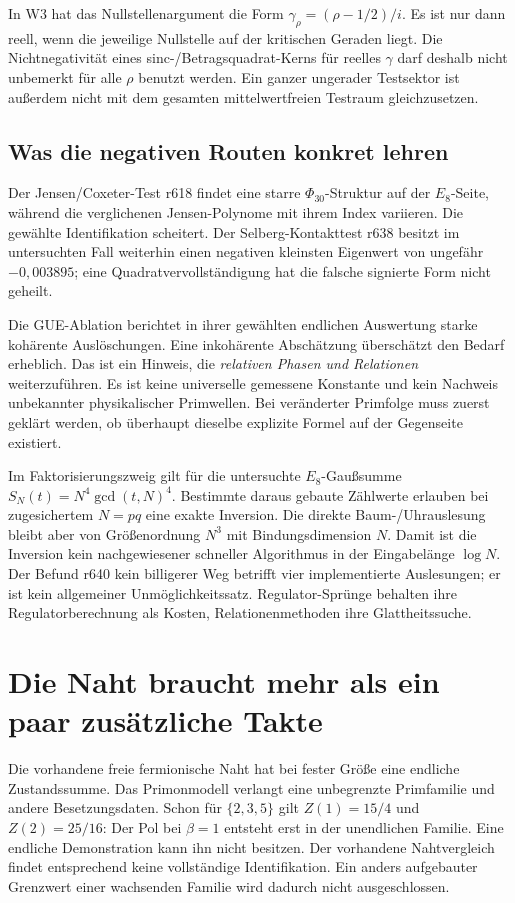 In W3 hat das Nullstellenargument die Form $\gamma_\rho=(\rho-1/2)/i$. Es ist nur dann reell, wenn die jeweilige Nullstelle auf der kritischen Geraden liegt. Die Nichtnegativität eines sinc-/Betragsquadrat-Kerns für reelles $\gamma$ darf deshalb nicht unbemerkt für alle $\rho$ benutzt werden. Ein ganzer ungerader Testsektor ist außerdem nicht mit dem gesamten mittelwertfreien Testraum gleichzusetzen. 

\subsection{Was die negativen Routen konkret lehren}
Der Jensen/Coxeter-Test r618 findet eine starre $\Phi_{30}$-Struktur auf der $E_8$-Seite, während die verglichenen Jensen-Polynome mit ihrem Index variieren. Die gewählte Identifikation scheitert. Der Selberg-Kontakttest r638 besitzt im untersuchten Fall weiterhin einen negativen kleinsten Eigenwert von ungefähr $-0{,}003895$; eine Quadratvervollständigung hat die falsche signierte Form nicht geheilt. 

Die GUE-Ablation berichtet in ihrer gewählten endlichen Auswertung starke kohärente Auslöschungen. Eine inkohärente Abschätzung überschätzt den Bedarf erheblich. Das ist ein Hinweis, die \emph{relativen Phasen und Relationen} weiterzuführen. Es ist keine universelle gemessene Konstante und kein Nachweis unbekannter physikalischer Primwellen. Bei veränderter Primfolge muss zuerst geklärt werden, ob überhaupt dieselbe explizite Formel auf der Gegenseite existiert. 

Im Faktorisierungszweig gilt für die untersuchte $E_8$-Gaußsumme $S_N(t)=N^4\gcd(t,N)^4$. Bestimmte daraus gebaute Zählwerte erlauben bei zugesichertem $N=pq$ eine exakte Inversion. Die direkte Baum-/Uhrauslesung bleibt aber von Größenordnung $N^3$ mit Bindungsdimension $N$. Damit ist die Inversion kein nachgewiesener schneller Algorithmus in der Eingabelänge $\log N$. Der Befund r640 \glqq kein billigerer Weg\grqq{} betrifft vier implementierte Auslesungen; er ist kein allgemeiner Unmöglichkeitssatz. Regulator-Sprünge behalten ihre Regulatorberechnung als Kosten, Relationenmethoden ihre Glattheitssuche. 

\section{Die Naht braucht mehr als ein paar zusätzliche Takte}
Die vorhandene freie fermionische Naht hat bei fester Größe eine endliche Zustandssumme. Das Primonmodell verlangt eine unbegrenzte Primfamilie und andere Besetzungsdaten. Schon für $\{2,3,5\}$ gilt $Z(1)=15/4$ und $Z(2)=25/16$: Der Pol bei $\beta=1$ entsteht erst in der unendlichen Familie. Eine endliche Demonstration kann ihn nicht besitzen. Der vorhandene Nahtvergleich findet entsprechend keine vollständige Identifikation. Ein anders aufgebauter Grenzwert einer wachsenden Familie wird dadurch nicht ausgeschlossen. 

